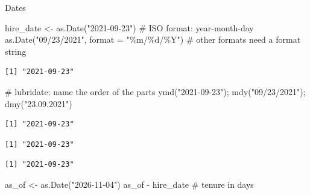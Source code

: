 \documentclass[
  ignorenonframetext,
  aspectratio=169,
]{beamer}
\newenvironment{Shaded}{\begin{snugshade}}{\end{snugshade}}
\newcommand{\AttributeTok}[1]{\textcolor[rgb]{0.40,0.45,0.13}{#1}}
\newcommand{\CommentTok}[1]{\textcolor[rgb]{0.37,0.37,0.37}{#1}}
\newcommand{\FunctionTok}[1]{\textcolor[rgb]{0.28,0.35,0.67}{#1}}
\newcommand{\NormalTok}[1]{\textcolor[rgb]{0.00,0.23,0.31}{#1}}
\newcommand{\OtherTok}[1]{\textcolor[rgb]{0.00,0.23,0.31}{#1}}
\newcommand{\SpecialCharTok}[1]{\textcolor[rgb]{0.37,0.37,0.37}{#1}}
\newcommand{\StringTok}[1]{\textcolor[rgb]{0.13,0.47,0.30}{#1}}
\begin{document}
\begin{frame}[fragile]{Dates}
\protect\hypertarget{dates}{}
\begin{Shaded}
\begin{Highlighting}[]
\NormalTok{hire\_date }\OtherTok{\textless{}{-}} \FunctionTok{as.Date}\NormalTok{(}\StringTok{"2021{-}09{-}23"}\NormalTok{)              }\CommentTok{\# ISO format: year{-}month{-}day}
\FunctionTok{as.Date}\NormalTok{(}\StringTok{"09/23/2021"}\NormalTok{, }\AttributeTok{format =} \StringTok{"\%m/\%d/\%Y"}\NormalTok{)      }\CommentTok{\# other formats need a format string}
\end{Highlighting}
\end{Shaded}

\begingroup\tiny\color{darkgray}

\begin{verbatim}
[1] "2021-09-23"
\end{verbatim}

\endgroup

\begin{Shaded}
\begin{Highlighting}[]
\CommentTok{\# lubridate: name the order of the parts}
\FunctionTok{ymd}\NormalTok{(}\StringTok{"2021{-}09{-}23"}\NormalTok{); }\FunctionTok{mdy}\NormalTok{(}\StringTok{"09/23/2021"}\NormalTok{); }\FunctionTok{dmy}\NormalTok{(}\StringTok{"23.09.2021"}\NormalTok{)}
\end{Highlighting}
\end{Shaded}

\begingroup\tiny\color{darkgray}

\begin{verbatim}
[1] "2021-09-23"
\end{verbatim}

\endgroup

\begingroup\tiny\color{darkgray}

\begin{verbatim}
[1] "2021-09-23"
\end{verbatim}

\endgroup

\begingroup\tiny\color{darkgray}

\begin{verbatim}
[1] "2021-09-23"
\end{verbatim}

\endgroup

\begin{Shaded}
\begin{Highlighting}[]
\NormalTok{as\_of }\OtherTok{\textless{}{-}} \FunctionTok{as.Date}\NormalTok{(}\StringTok{"2026{-}11{-}04"}\NormalTok{)}
\NormalTok{as\_of }\SpecialCharTok{{-}}\NormalTok{ hire\_date                                }\CommentTok{\# tenure in days}
\end{Highlighting}
\end{Shaded}


\end{frame}
\end{document}
